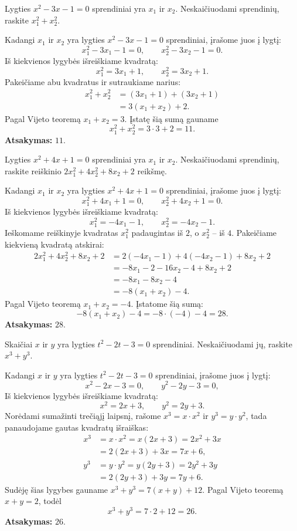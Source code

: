 \documentclass[11pt,a4paper]{scrartcl}
\begin{document}
\begin{example}
Lygties $x^2-3x-1=0$ sprendiniai yra $x_1$ ir $x_2$. Neskaičiuodami sprendinių, raskite $x_1^2+x_2^2$.
\end{example}
\begin{solution}
Kadangi $x_1$ ir $x_2$ yra lygties $x^2-3x-1=0$ sprendiniai, įrašome juos į lygtį:
\[
x_1^2-3x_1-1=0, \qquad x_2^2-3x_2-1=0.
\]
Iš kiekvienos lygybės išreiškiame kvadratą:
\[
x_1^2=3x_1+1, \qquad x_2^2=3x_2+1.
\]
Pakeičiame abu kvadratus ir sutraukiame narius:
\[
\begin{aligned}
x_1^2+x_2^2
&=(3x_1+1)+(3x_2+1)\\
&=3(x_1+x_2)+2.
\end{aligned}
\]
Pagal Vijeto teoremą $x_1+x_2=3$. Įstatę šią sumą gauname
\[
x_1^2+x_2^2=3\cdot3+2=11.
\]
\textbf{Atsakymas:} $11$.
\end{solution}

\begin{example}
Lygties $x^2+4x+1=0$ sprendiniai yra $x_1$ ir $x_2$. Neskaičiuodami sprendinių, raskite reiškinio $2x_1^2+4x_2^2+8x_2+2$ reikšmę.
\end{example}
\begin{solution}
Kadangi $x_1$ ir $x_2$ yra lygties $x^2+4x+1=0$ sprendiniai, įrašome juos į lygtį:
\[
x_1^2+4x_1+1=0, \qquad x_2^2+4x_2+1=0.
\]
Iš kiekvienos lygybės išreiškiame kvadratą:
\[
x_1^2=-4x_1-1, \qquad x_2^2=-4x_2-1.
\]
Ieškomame reiškinyje kvadratas $x_1^2$ padaugintas iš $2$, o $x_2^2$ – iš $4$. Pakeičiame kiekvieną kvadratą atskirai:
\[
\begin{aligned}
2x_1^2+4x_2^2+8x_2+2
&=2(-4x_1-1)+4(-4x_2-1)+8x_2+2\\
&=-8x_1-2-16x_2-4+8x_2+2\\
&=-8x_1-8x_2-4\\
&=-8(x_1+x_2)-4.
\end{aligned}
\]
Pagal Vijeto teoremą $x_1+x_2=-4$. Įstatome šią sumą:
\[
-8(x_1+x_2)-4=-8\cdot(-4)-4=28.
\]
\textbf{Atsakymas:} $28$.
\end{solution}

\begin{example}
Skaičiai $x$ ir $y$ yra lygties $t^2-2t-3=0$ sprendiniai. Neskaičiuodami jų, raskite $x^3+y^3$.
\end{example}
\begin{solution}
Kadangi $x$ ir $y$ yra lygties $t^2-2t-3=0$ sprendiniai, įrašome juos į lygtį:
\[
x^2-2x-3=0, \qquad y^2-2y-3=0,
\]
Iš kiekvienos lygybės išreiškiame kvadratą:
\[
x^2=2x+3, \qquad y^2=2y+3.
\]
Norėdami sumažinti trečiąjį laipsnį, rašome $x^3=x\cdot x^2$ ir $y^3=y\cdot y^2$, tada panaudojame gautas kvadratų išraiškas:
\[
\begin{aligned}
x^3&=x\cdot x^2=x(2x+3)=2x^2+3x\\
&=2(2x+3)+3x=7x+6,\\[2pt]
y^3&=y\cdot y^2=y(2y+3)=2y^2+3y\\
&=2(2y+3)+3y=7y+6.
\end{aligned}
\]
Sudėję šias lygybes gauname $x^3+y^3=7(x+y)+12$. Pagal Vijeto teoremą $x+y=2$, todėl
\[
x^3+y^3=7\cdot2+12=26.
\]
\textbf{Atsakymas:} $26$.
\end{solution}
\end{document}
